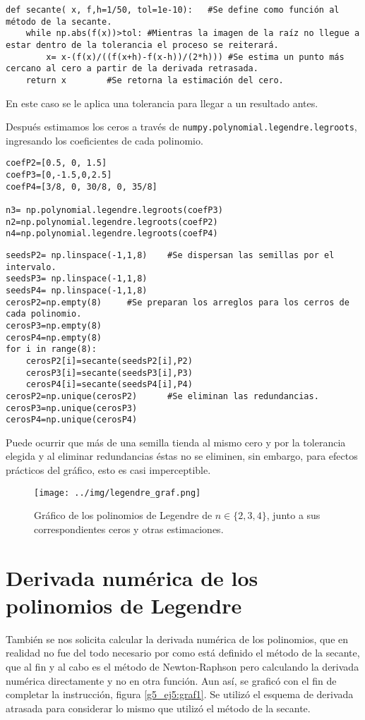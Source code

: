 \documentclass[../portafolio.tex]{subfiles}
\begin{document}
\begin{verbatim}
def secante( x, f,h=1/50, tol=1e-10):	#Se define como función al método de la secante.
    while np.abs(f(x))>tol:	#Mientras la imagen de la raíz no llegue a estar dentro de la tolerancia el proceso se reiterará.
        x= x-(f(x)/((f(x+h)-f(x-h))/(2*h)))	#Se estima un punto más cercano al cero a partir de la derivada retrasada.
    return x		#Se retorna la estimación del cero.
\end{verbatim}
En este caso se le aplica una tolerancia para llegar a un resultado antes. 

Después estimamos los ceros a través de \texttt{numpy.polynomial.legendre.legroots}, ingresando los coeficientes de cada polinomio.
\begin{verbatim}
coefP2=[0.5, 0, 1.5]
coefP3=[0,-1.5,0,2.5]
coefP4=[3/8, 0, 30/8, 0, 35/8]

n3= np.polynomial.legendre.legroots(coefP3)
n2=np.polynomial.legendre.legroots(coefP2)
n4=np.polynomial.legendre.legroots(coefP4)
\end{verbatim}

\begin{verbatim}
seedsP2= np.linspace(-1,1,8)	#Se dispersan las semillas por el intervalo.
seedsP3= np.linspace(-1,1,8)
seedsP4= np.linspace(-1,1,8)
cerosP2=np.empty(8)		#Se preparan los arreglos para los cerros de cada polinomio.
cerosP3=np.empty(8)
cerosP4=np.empty(8)
for i in range(8):
    cerosP2[i]=secante(seedsP2[i],P2)
    cerosP3[i]=secante(seedsP3[i],P3)
    cerosP4[i]=secante(seedsP4[i],P4)
cerosP2=np.unique(cerosP2)		#Se eliminan las redundancias.
cerosP3=np.unique(cerosP3)
cerosP4=np.unique(cerosP4)
\end{verbatim}
Puede ocurrir que más de una semilla tienda al mismo cero y por la tolerancia elegida y al eliminar redundancias éstas no se eliminen, sin embargo, para efectos prácticos del gráfico, esto es casi imperceptible.
\begin{figure}
\centering
\texttt{[image: ../img/legendre\_graf.png]}
\caption{Gráfico de los polinomios de Legendre de $n \in \{2,3,4\}$, junto a sus correspondientes ceros y otras estimaciones.}\label{g5_ej5:graf}
\end{figure}

\section{Derivada numérica de los polinomios de Legendre}

También se nos solicita calcular la derivada numérica de los polinomios, que en realidad no fue del todo necesario por como está definido el método de la secante, que al fin y al cabo es el método de Newton-Raphson pero calculando la derivada numérica directamente y no en otra función. Aun así, se graficó con el fin de completar la instrucción, figura \ref{g5_ej5:graf1}. Se utilizó el esquema de derivada atrasada para considerar lo mismo que utilizó el método de la secante.
\end{document}
